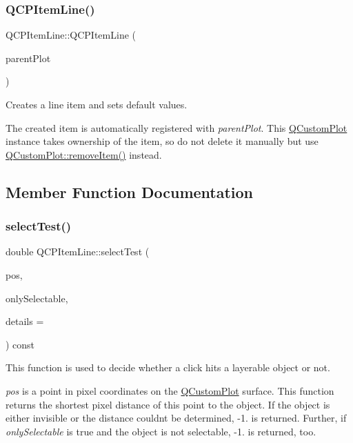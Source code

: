 \subsubsection{\texorpdfstring{Q\+C\+P\+Item\+Line()}{QCPItemLine()}}
{\footnotesize\ttfamily Q\+C\+P\+Item\+Line\+::\+Q\+C\+P\+Item\+Line (\begin{DoxyParamCaption}\item[{\hyperlink{class_q_custom_plot}{Q\+Custom\+Plot} $\ast$}]{parent\+Plot }\end{DoxyParamCaption})\hspace{0.3cm}{\ttfamily [explicit]}}

Creates a line item and sets default values.

The created item is automatically registered with {\itshape parent\+Plot}. This \hyperlink{class_q_custom_plot}{Q\+Custom\+Plot} instance takes ownership of the item, so do not delete it manually but use \hyperlink{class_q_custom_plot_ae04446557292551e8fb6e2c106e1848d}{Q\+Custom\+Plot\+::remove\+Item()} instead. 

\subsection{Member Function Documentation}
\mbox{\label{class_q_c_p_item_line_a8e02bfbca04fbcf3dbc375a2bf693229}} 
\subsubsection{\texorpdfstring{select\+Test()}{selectTest()}}
{\footnotesize\ttfamily double Q\+C\+P\+Item\+Line\+::select\+Test (\begin{DoxyParamCaption}\item[{const Q\+PointF \&}]{pos,  }\item[{bool}]{only\+Selectable,  }\item[{Q\+Variant $\ast$}]{details = {} }\end{DoxyParamCaption}) const\hspace{0.3cm}{\ttfamily [virtual]}}

This function is used to decide whether a click hits a layerable object or not.

{\itshape pos} is a point in pixel coordinates on the \hyperlink{class_q_custom_plot}{Q\+Custom\+Plot} surface. This function returns the shortest pixel distance of this point to the object. If the object is either invisible or the distance couldn\textquotesingle{}t be determined, -\/1. is returned. Further, if {\itshape only\+Selectable} is true and the object is not selectable, -\/1. is returned, too.

